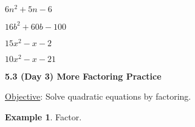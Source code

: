 \documentclass{report}
\theoremstyle{definition}
\newtheorem{example}{\bf Example}
\begin{document}
\begin{enumerate}
\begin{minipage}[t]{0.45\linewidth}
		\item $6n^2+5n-6$\\
		\vspace{2.5cm}
	\end{minipage}
	\hfill
	\begin{minipage}[t]{0.45\linewidth}
		\item $16b^2+60b-100$\\
		\vspace{2.5cm}
	\end{minipage}
	\begin{minipage}[t]{0.45\linewidth}
		\item $15x^2-x-2$\\
		\vspace{2.5cm}
	\end{minipage}
	\hfill
	\begin{minipage}[t]{0.45\linewidth}
		\item $10x^2-x-21$\\
		\vspace{2.5cm}
	\end{minipage}

\end{enumerate}

\vfill
\small
\color{red}
\begin{flushright}
\end{flushright}
\color{black}
\normalsize

 \newpage

\noindent\Large{\textbf{5.3 (Day 3) More Factoring Practice}}\normalsize\\

\vspace{-0.5cm}

 \hfill \underline{Objective}: Solve quadratic equations by factoring. \\

\begin{example}
Factor.
\end{example}
\end{document}
